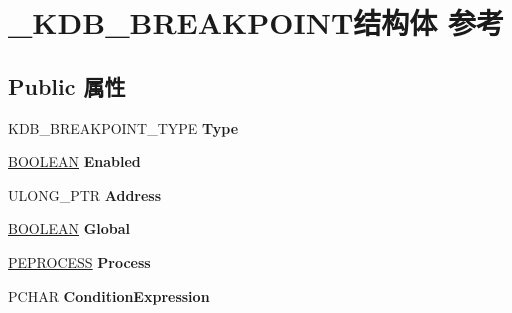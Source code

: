 \hypertarget{struct___k_d_b___b_r_e_a_k_p_o_i_n_t}{}\section{\+\_\+\+K\+D\+B\+\_\+\+B\+R\+E\+A\+K\+P\+O\+I\+N\+T结构体 参考}
\label{struct___k_d_b___b_r_e_a_k_p_o_i_n_t}
\subsection*{Public 属性}
\begin{DoxyCompactItemize}
\item 
\mbox{\label{struct___k_d_b___b_r_e_a_k_p_o_i_n_t_ac3f523213f633b62624fa9cc64ae6e55}} 
K\+D\+B\+\_\+\+B\+R\+E\+A\+K\+P\+O\+I\+N\+T\+\_\+\+T\+Y\+PE {\bfseries Type}
\item 
\mbox{\label{struct___k_d_b___b_r_e_a_k_p_o_i_n_t_a4d9ae4c4256bc3d6ea1f67fe7c07467f}} 
\hyperlink{_processor_bind_8h_a112e3146cb38b6ee95e64d85842e380a}{B\+O\+O\+L\+E\+AN} {\bfseries Enabled}
\item 
\mbox{\label{struct___k_d_b___b_r_e_a_k_p_o_i_n_t_ab4e0f651e34da4f1abf949b11ace724f}} 
U\+L\+O\+N\+G\+\_\+\+P\+TR {\bfseries Address}
\item 
\mbox{\label{struct___k_d_b___b_r_e_a_k_p_o_i_n_t_ad2d474698a5764ad1179031b5abf8fd7}} 
\hyperlink{_processor_bind_8h_a112e3146cb38b6ee95e64d85842e380a}{B\+O\+O\+L\+E\+AN} {\bfseries Global}
\item 
\mbox{\label{struct___k_d_b___b_r_e_a_k_p_o_i_n_t_ab9040280bd8ee82ebcd58ff043582ccd}} 
\hyperlink{struct___e_p_r_o_c_e_s_s}{P\+E\+P\+R\+O\+C\+E\+SS} {\bfseries Process}
\item 
\mbox{\label{struct___k_d_b___b_r_e_a_k_p_o_i_n_t_aa09941e3c2aafad3d4a6ed914404c930}} 
P\+C\+H\+AR {\bfseries Condition\+Expression}
\item 
\mbox{\label{struct___k_d_b___b_r_e_a_k_p_o_i_n_t_a1b6036138f7964d514499cbe68075342}} 

\end{DoxyCompactItemize}
